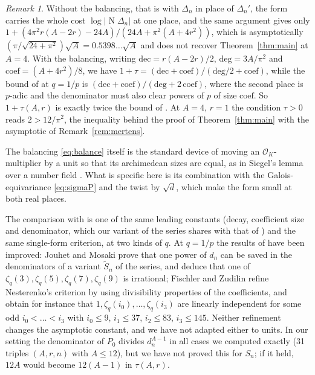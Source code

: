 \documentclass[11pt]{amsart}
\theoremstyle{definition}
\theoremstyle{remark}
\newtheorem{remark}[theorem]{Remark}
\numberwithin{equation}{section}
\newcommand{\cO}{\mathcal{O}}
\newcommand{\Nm}{\operatorname{N}}
\begin{document}
\begin{remark}\label{rem:balance}
Without the balancing, that is with $\Delta_n$ in place of $\Delta_n'$, the form carries the whole cost
$\log|\Nm\Delta_n|$ at one place, and the same argument gives only
$1+(4\pi^2r(A-2r)-24A)/(24A+\pi^2(A+4r^2))$, which is asymptotically $(\pi/\sqrt{24+\pi^2})\sqrt A=0.5398\ldots\sqrt A$
and does not recover Theorem~\ref{thm:main} at $A=4$. With the balancing, writing $\mathrm{dec}=r(A-2r)/2$,
$\mathrm{deg}=3A/\pi^2$ and $\mathrm{coef}=(A+4r^2)/8$, we have $1+\tau=(\mathrm{dec}+\mathrm{coef})/(\mathrm{deg}/2+
\mathrm{coef})$, while the bound of \cite[Theorem~2]{KRZ06} at $q=1/p$ is $(\mathrm{dec}+\mathrm{coef})/(\mathrm{deg}+
2\,\mathrm{coef})$, where the second place is $p$-adic and the denominator must also clear powers of $p$ of size
$\mathrm{coef}$. So $1+\tau(A,r)$ is exactly twice the bound of \cite{KRZ06}. At $A=4$, $r=1$ the condition $\tau>0$
reads $2>12/\pi^2$, the inequality behind the proof of Theorem~\ref{thm:main} with the asymptotic of
Remark~\ref{rem:mertens}.

The balancing \eqref{eq:balance} itself is the standard device of moving an $\cO_K$-multiplier by a unit so that its
archimedean sizes are equal, as in Siegel's lemma over a number field \cite[Chapter~2]{BG06}. What is specific here is
its combination with the Galois-equivariance \eqref{eq:sigmaP} and the twist by $\sqrt d$, which make the form small at
both real places.

The comparison with \cite{KRZ06} is one of the same leading constants (decay, coefficient size and denominator, which our variant of the series shares with that of \cite{KRZ06}) and the same single-form criterion, at two kinds of $q$. At $q=1/p$ the results of
\cite{KRZ06} have been improved: Jouhet and Mosaki \cite{JM10} prove that one power of $d_n$ can be saved in the
denominators of a variant $\tilde S_n$ of the series, and deduce that one of $\zeta_q(3),\zeta_q(5),\zeta_q(7),
\zeta_q(9)$ is irrational; Fischler and Zudilin \cite[Theorems~4 and~6]{FZ10} refine Nesterenko's criterion by using
divisibility properties of the coefficients, and obtain for instance that $1,\zeta_q(i_0),\dots,\zeta_q(i_3)$ are
linearly independent for some odd $i_0<\dots<i_3$ with $i_0\le9$, $i_1\le37$, $i_2\le83$, $i_3\le145$. Neither
refinement changes the asymptotic constant, and we have not adapted either to units. In our setting the denominator of
$P_0$ divides $d_n^{A-1}$ in all cases we computed exactly (31 triples $(A,r,n)$ with $A\le12$), but we have not proved
this for $S_n$; if it held, $12A$ would become $12(A-1)$ in $\tau(A,r)$.
\end{remark}
\end{document}
